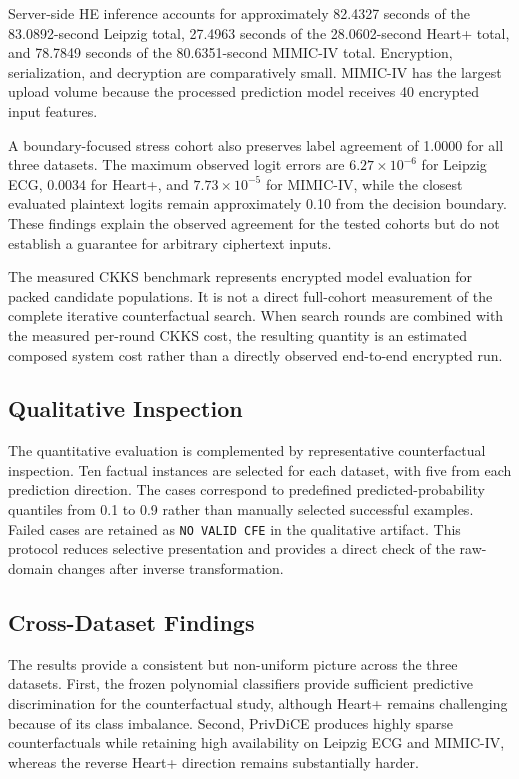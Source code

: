 \documentclass[preprint,12pt]{elsarticle}
\begin{document}
Server-side HE inference accounts for approximately 82.4327 seconds of the
83.0892-second Leipzig total, 27.4963 seconds of the 28.0602-second Heart+
total, and 78.7849 seconds of the 80.6351-second MIMIC-IV total. Encryption,
serialization, and decryption are comparatively small. MIMIC-IV has the
largest upload volume because the processed prediction model receives 40
encrypted input features.

A boundary-focused stress cohort also preserves label agreement of 1.0000 for
all three datasets. The maximum observed logit errors are
$6.27\times10^{-6}$ for Leipzig ECG, $0.0034$ for Heart+, and
$7.73\times10^{-5}$ for MIMIC-IV, while the closest evaluated plaintext logits
remain approximately 0.10 from the decision boundary. These findings explain
the observed agreement for the tested cohorts but do not establish a guarantee
for arbitrary ciphertext inputs.

The measured CKKS benchmark represents encrypted model evaluation for packed
candidate populations. It is not a direct full-cohort measurement of the
complete iterative counterfactual search. When search rounds are combined with
the measured per-round CKKS cost, the resulting quantity is an estimated
composed system cost rather than a directly observed end-to-end encrypted run.

\subsection{Qualitative Inspection}
\label{subsec:qualitative_results}

The quantitative evaluation is complemented by representative counterfactual
inspection. Ten factual instances are selected for each dataset, with five
from each prediction direction. The cases correspond to predefined
predicted-probability quantiles from 0.1 to 0.9 rather than manually selected
successful examples. Failed cases are retained as \texttt{NO VALID CFE} in the
qualitative artifact. This protocol reduces selective presentation and provides
a direct check of the raw-domain changes after inverse transformation.

\subsection{Cross-Dataset Findings}
\label{subsec:cross_dataset_synthesis}

The results provide a consistent but non-uniform picture across the three
datasets. First, the frozen polynomial classifiers provide sufficient
predictive discrimination for the counterfactual study, although Heart+ remains
challenging because of its class imbalance. Second, PrivDiCE produces highly
sparse counterfactuals while retaining high availability on Leipzig ECG and
MIMIC-IV, whereas the reverse Heart+ direction remains substantially harder.
\end{document}
